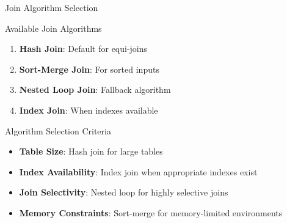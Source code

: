 \documentclass[aspectratio=169]{beamer}
\begin{document}
\begin{frame}{Join Algorithm Selection}
\begin{block}{Available Join Algorithms}
\begin{enumerate}
    \item \textbf{Hash Join}: Default for equi-joins
    \item \textbf{Sort-Merge Join}: For sorted inputs
    \item \textbf{Nested Loop Join}: Fallback algorithm
    \item \textbf{Index Join}: When indexes available
\end{enumerate}
\end{block}

\begin{block}{Algorithm Selection Criteria}
\begin{itemize}
    \item \textbf{Table Size}: Hash join for large tables
    \item \textbf{Index Availability}: Index join when appropriate indexes exist
    \item \textbf{Join Selectivity}: Nested loop for highly selective joins
    \item \textbf{Memory Constraints}: Sort-merge for memory-limited environments
\end{itemize}
\end{block}
\end{frame}
\end{document}
